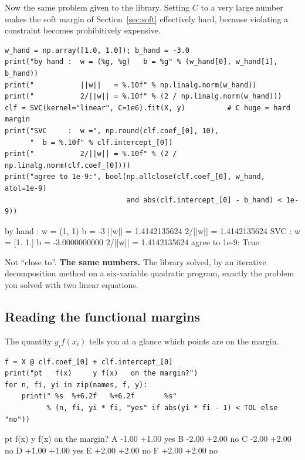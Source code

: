 \documentclass[11pt]{article}
\begin{document}
Now the same problem given to the library. Setting $C$ to a very large number
makes the soft margin of Section~\ref{sec:soft} effectively hard, because
violating a constraint becomes prohibitively expensive.

\begin{lstlisting}
w_hand = np.array([1.0, 1.0]); b_hand = -3.0
print("by hand :  w = (%g, %g)   b = %g" % (w_hand[0], w_hand[1], b_hand))
print("           ||w||   = %.10f" % np.linalg.norm(w_hand))
print("           2/||w|| = %.10f" % (2 / np.linalg.norm(w_hand)))
clf = SVC(kernel="linear", C=1e6).fit(X, y)          # C huge = hard margin
print("SVC     :  w =", np.round(clf.coef_[0], 10),
      "  b = %.10f" % clf.intercept_[0])
print("           2/||w|| = %.10f" % (2 / np.linalg.norm(clf.coef_[0])))
print("agree to 1e-9:", bool(np.allclose(clf.coef_[0], w_hand, atol=1e-9)
                             and abs(clf.intercept_[0] - b_hand) < 1e-9))
\end{lstlisting}
\begin{codeout}
by hand :  w = (1, 1)   b = -3
           ||w||   = 1.4142135624
           2/||w|| = 1.4142135624
SVC     :  w = [1. 1.]   b = -3.0000000000
           2/||w|| = 1.4142135624
agree to 1e-9: True
\end{codeout}

Not ``close to''. \textbf{The same numbers.} The library solved, by an
iterative decomposition method on a six-variable quadratic program, exactly the
problem you solved with two linear equations.

\subsection{Reading the functional margins}

The quantity $y_i f(x_i)$ tells you at a glance which points are on the margin.

\begin{lstlisting}
f = X @ clf.coef_[0] + clf.intercept_[0]
print("pt   f(x)     y f(x)   on the margin?")
for n, fi, yi in zip(names, f, y):
    print(" %s  %+6.2f   %+6.2f       %s"
          % (n, fi, yi * fi, "yes" if abs(yi * fi - 1) < TOL else "no"))
\end{lstlisting}
\begin{codeout}
pt   f(x)     y f(x)   on the margin?
 A   -1.00    +1.00       yes
 B   -2.00    +2.00       no
 C   -2.00    +2.00       no
 D   +1.00    +1.00       yes
 E   +2.00    +2.00       no
 F   +2.00    +2.00       no
\end{codeout}
\end{document}
